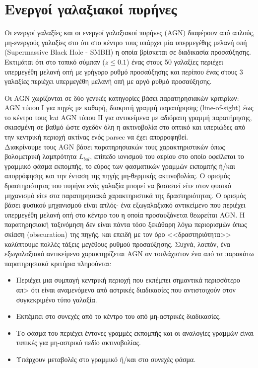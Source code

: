 \chapter{Ενεργοί γαλαξιακοί πυρήνες} 

Οι ενεργοί γαλαξίες και οι ενεργοί γαλαξιακοί πυρήνες (\textlatin{AGN}) διαφέρουν από απλούς, μη-ενεργούς γαλαξίες στο ότι στο κέντρο τους υπάρχει μία υπερμεγέθης μελανή οπή (\textlatin{Supermassive Black Hole - SMBH}) η οποία βρίσκεται σε διαδικασία προσαύξησης. Εκτιμάται ότι στο τοπικό σύμπαν ($z \leq 0.1$) ένας στους 50 γαλαξίες περιέχει υπερμεγέθη μελανή οπή με γρήγορο ρυθμό προσαύξησης και περίπου ένας στους 3 γαλαξίες περιέχει υπερμεγέθη μελανή οπή με αργό ρυθμό προσαύξησης\cite{netzer_2013}.

Οι \textlatin{AGN} χωρίζονται σε δύο γενικές κατηγορίες βάσει παρατηρησιακών κριτιρίων: \textlatin{AGN} τύπου Ι για πηγές με καθαρή, διακριτή γραμμή παρατήρησης \textlatin{(line-of-sight)} έως το κέντρο τους kai \textlatin{AGN} τύπου ΙΙ για αντικείμενα με αδιόρατη γραμμή παρατήρησης, σκιασμένη σε βαθμό ώστε σχεδόν όλη η ακτινοβολία στο οπτικό και υπεριώδες από την κεντρική περιοχή ακτίνας ενός \textlatin{parsec} να έχει απορροφηθεί. \\
Διακρίνουμε τους \textlatin{AGN} βάσει παρατηρησιακών τους χαρακτηριστικών όπως βολομετρική λαμπρότητα $ L_{bol}$, επίπεδο ιονισμού του αερίου στο οποίο οφείλεται το γραμμικό φάσμα εκπομπής, το εύρος των φασματικών γραμμών εκπομπής ή/και απορρόφησης και την ένταση της πηγής μη-θερμικής ακτινοβολίας. Ο ορισμός δραστηριότητας του πυρήνα ενός γαλαξία μπορεί να βασιστεί είτε στον φυσικό μηχανισμό είτε στα παρατηρησιακά χαρακτηριστικά της δραστηριότητας. Ο ορισμός βάσει φυσικού μηχανισμού είναι απλός- ένα εξωγαλαξιακό αντικείμενο που περιέχει υπερμεγέθη μελανή οπή στο κέντρο του η οποία προσαυξάνεται θεωρείται \textlatin{AGN}. Η παρατηρησιακή ταξινόμηση δεν είναι πάντα τόσο ξεκάθαρη λόγω περιορισμών όπως σκίαση \textlatin{(obscuration)} της πηγής, και επειδή με τον όρο <<δραστηριότητα>> καλύπτουμε πολλές τάξεις μεγέθους ρυθμού προσαύξησης. Συχνά, λοιπόν, ένα εξωγαλαξιακό αντικείμενο χαρακτηρίζεται \textlatin{AGN} αν τουλάχιστον ένα από τα παρακάτω παρατηρησιακά κριτήρια πληρούνται\cite{netzer_2013}:
\begin{itemize}
    \item Περιέχει μια συμπαγή κεντρική περιοχή που εκπέμπει σημαντικά περισσότερο απ> ότι είναι αναμενόμενο από αστρικές διαδικασίες που αντιστοιχούν στον συγκεκριμένο τύπο γαλαξία.
    \item Εκπέμπει στο συνεχές από το κέντρο του από μη-αστρικές διαδικασίες.
    \item Το φάσμα του περιέχει έντονες γραμμές εκπομπής και οι αναλογίες γραμμών είναι τυπικές για μη-αστρικό πεδίο ακτινοβολίας.
    \item Υπάρχουν μεταβολές στο γραμμικό ή/και στο συνεχές φάσμα.
\end{itemize}
